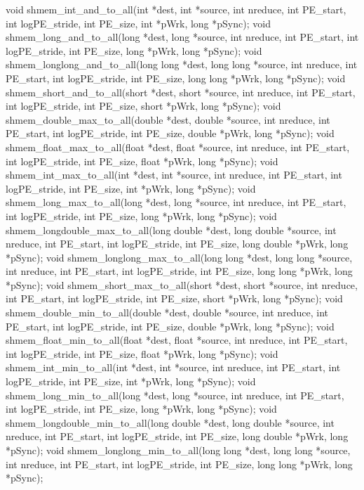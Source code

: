 \synC %

void shmem_int_and_to_all(int *dest, int *source, int nreduce, int PE_start, int logPE_stride, int PE_size, int *pWrk, long *pSync);
void shmem_long_and_to_all(long *dest, long *source, int nreduce, int PE_start, int logPE_stride, int PE_size, long *pWrk, long *pSync);
void shmem_longlong_and_to_all(long long *dest, long long *source, int nreduce, int PE_start, int logPE_stride, int PE_size, long long *pWrk, long *pSync);
void shmem_short_and_to_all(short *dest, short *source, int nreduce, int PE_start, int logPE_stride, int PE_size, short *pWrk, long *pSync);
void shmem_double_max_to_all(double *dest, double *source, int nreduce, int PE_start, int logPE_stride, int PE_size, double *pWrk, long *pSync);
void shmem_float_max_to_all(float *dest, float *source, int nreduce, int PE_start, int logPE_stride, int PE_size, float *pWrk, long *pSync);
void shmem_int_max_to_all(int *dest, int *source, int nreduce, int PE_start, int logPE_stride, int PE_size, int *pWrk, long *pSync);
void shmem_long_max_to_all(long *dest, long *source, int nreduce, int PE_start, int logPE_stride, int PE_size, long *pWrk, long *pSync);
void shmem_longdouble_max_to_all(long double *dest, long double *source, int nreduce, int PE_start, int logPE_stride, int PE_size, long double *pWrk, long *pSync);
void shmem_longlong_max_to_all(long long *dest, long long *source, int nreduce, int PE_start, int logPE_stride, int PE_size, long long *pWrk, long *pSync);
void shmem_short_max_to_all(short *dest, short *source, int nreduce, int PE_start, int logPE_stride, int PE_size, short *pWrk, long *pSync);
void shmem_double_min_to_all(double *dest, double *source, int nreduce, int PE_start, int logPE_stride, int PE_size, double *pWrk, long *pSync);
void shmem_float_min_to_all(float *dest, float *source, int nreduce, int PE_start, int logPE_stride, int PE_size, float *pWrk, long *pSync);
void shmem_int_min_to_all(int *dest, int *source, int nreduce, int PE_start, int logPE_stride, int PE_size, int *pWrk, long *pSync);
void shmem_long_min_to_all(long *dest, long *source, int nreduce, int PE_start, int logPE_stride, int PE_size, long *pWrk, long *pSync);
void shmem_longdouble_min_to_all(long double *dest, long double *source, int nreduce, int PE_start, int logPE_stride, int PE_size, long double *pWrk, long *pSync);
void shmem_longlong_min_to_all(long long *dest, long long *source, int nreduce, int PE_start, int logPE_stride, int PE_size, long long *pWrk, long *pSync);
